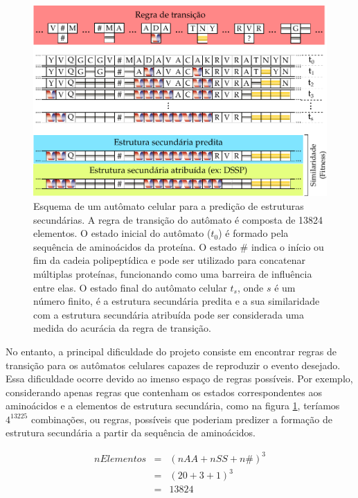 \begin{figure}[h]
	\includegraphics[width=1\linewidth]{ca-ss_final}
	\caption{Esquema de um autômato celular para a predição de estruturas secundárias. A regra de transição do autômato é composta de 13824 elementos. O estado inicial do autômato ($t_{0}$) é formado pela sequência de aminoácidos da proteína. O estado $\#$ indica o início ou fim da cadeia polipeptídica e pode ser utilizado para concatenar múltiplas proteínas, funcionando como uma barreira de influência entre elas. O estado final do autômato celular $t_{s}$, onde $s$ é um número finito, é a estrutura secundária predita e a sua similaridade com a estrutura secundária atribuída pode ser considerada uma medida do acurácia da regra de transição.}
	\label{fig:ca_ss}
\end{figure}

No entanto, a principal dificuldade do projeto consiste em encontrar regras de transição para os autômatos celulares capazes de reproduzir o evento desejado. Essa dificuldade ocorre devido ao imenso espaço de regras possíveis. Por exemplo, considerando apenas regras que contenham os estados correspondentes aos aminoácidos e a elementos de estrutura secundária, como na figura \ref{fig:ca_ss}, teríamos $4^{13225}$ combinações, ou regras, possíveis que poderiam predizer a formação de estrutura secundária a partir da sequência de aminoácidos.

\begin{eqnarray*}\label{eq_rules}
nElementos & = & (nAA + nSS + n\#)^3\\
		   & = & (20 + 3 + 1)^3\\
           & = & 13824
\end{eqnarray*}



